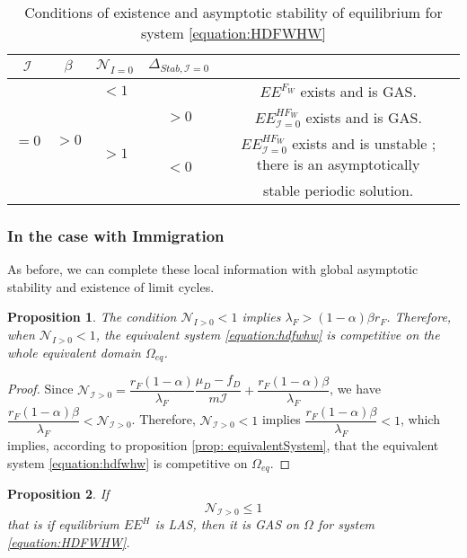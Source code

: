 \documentclass{article}
\newcommand{\lfw}{\lambda_{F}}
\newcommand{\lfw}{\lambda_{F}}
\newcommand{\cI}{\mathcal{I}}
\newtheorem{prop}{Proposition}
\begin{document}
\begin{table}[!ht]
\centering
\def\arraystretch{2}
\begin{tabular}{c|c|c|c|c}
$\cI$ &$\beta$ & $\mathcal{N}_{I =0}$ &  $\Delta_{Stab, \cI =0}$ & \\
\hline
\multirow{4}{*}{$=0$}&\multirow{4}{*}{$>0$} & $ < 1$ & &$EE^{F_W}$ exists and is GAS.  \\
\cline{3-5}
 & & \multirow{3}{*}{$> 1$} & $ >0$ &$EE^{HF_W}_{\cI=0}$ exists and is GAS.\\
 \cline{4-5}
 & & &\multirow{2}{*}{$ <0 $} & $EE^{HF_W}_{\cI=0}$ exists and is unstable ; there is an asymptotically \\
& & & &  stable periodic solution.
\end{tabular}
\caption{\centering Conditions of existence and asymptotic stability of equilibrium for system \eqref{equation:HDFWHW}}
\end{table}


\subsubsection{In the case with Immigration}

As before, we can complete these local information with global asymptotic stability and existence of limit cycles. 

\begin{prop}
The condition $\mathcal{N}_{I > 0} < 1$ implies $\lfw > (1-\alpha) \beta r_F$. Therefore, when $\mathcal{N}_{I > 0} < 1$, the equivalent system \eqref{equation:hdfwhw} is competitive on the whole equivalent domain $\Omega_{eq}$.
\end{prop}

\begin{proof}
Since $\mathcal{N}_{\cI > 0} = \dfrac{r_F(1-\alpha)}{\lfw}\dfrac{\mu_D - f_D}{m \cI} + \dfrac{r_F(1-\alpha) \beta}{\lfw}$, we have $\dfrac{r_F(1-\alpha) \beta}{\lfw} < \mathcal{N}_{\cI > 0}$. Therefore, $\mathcal{N}_{\cI > 0} < 1$ implies $\dfrac{r_F(1-\alpha) \beta}{\lfw} < 1$, which implies, according to proposition \ref{prop: equivalentSystem}, that the equivalent system \eqref{equation:hdfwhw} is competitive on $\Omega_{eq}$.
\end{proof}

\begin{prop}
If $$\mathcal{N}_{\cI > 0} \leq 1$$
that is if equilibrium $EE^{H}$ is LAS, then it is GAS on $\Omega$ for system \eqref{equation:HDFWHW}.
\end{prop}
\end{document}
